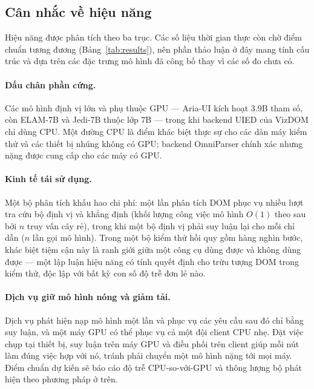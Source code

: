 \documentclass[11pt,a4paper]{article}
\begin{document}
\subsection{Cân nhắc về hiệu năng}
Hiệu năng được phân tích theo ba trục. Các số liệu thời gian thực còn chờ điểm chuẩn
tương đương (Bảng~\ref{tab:results}), nên phần thảo luận ở đây mang tính cấu trúc và
dựa trên các đặc trưng mô hình đã công bố thay vì các số đo chưa có.

\paragraph{Dấu chân phần cứng.} Các mô hình định vị lớn và phụ thuộc GPU --- Aria-UI
kích hoạt 3.9B tham số, còn ELAM-7B và Jedi-7B thuộc lớp 7B --- trong khi backend
UIED của VizDOM chỉ dùng CPU. Một đường CPU là điểm khác biệt thực sự cho các dàn máy
kiểm thử và các thiết bị nhúng không có GPU; backend OmniParser chính xác nhưng nặng
được cung cấp cho các máy có GPU.

\paragraph{Kinh tế tái sử dụng.} Một bộ phân tích khấu hao chi phí: một lần phân tích
DOM phục vụ nhiều lượt tra cứu bộ định vị và khẳng định (khối lượng công việc mô hình
$O(1)$ theo sau bởi $n$ truy vấn cây rẻ), trong khi một bộ định vị phải suy luận lại
cho mỗi chỉ dẫn ($n$ lần gọi mô hình). Trong một bộ kiểm thử hồi quy gồm hàng nghìn
bước, khác biệt tiệm cận này là ranh giới giữa một công cụ dùng được và không dùng
được --- một lập luận hiệu năng có tính quyết định cho trừu tượng DOM trong kiểm thử,
độc lập với bất kỳ con số độ trễ đơn lẻ nào.

\paragraph{Dịch vụ giữ mô hình nóng và giảm tải.} Dịch vụ phát hiện nạp mô hình một
lần và phục vụ các yêu cầu sau đó chỉ bằng suy luận, và một máy GPU có thể phục vụ cả
một đội client CPU nhẹ. Đặt việc chụp tại thiết bị, suy luận trên máy GPU và điều
phối trên client giúp mỗi nút làm đúng việc hợp với nó, tránh phải chuyển một mô hình
nặng tới mọi máy. Điểm chuẩn dự kiến sẽ báo cáo độ trễ CPU-so-với-GPU và thông lượng
bộ phát hiện theo phương pháp ở trên.

\end{document}
